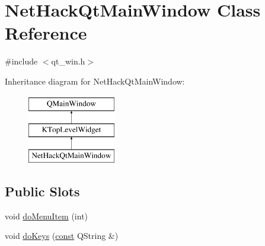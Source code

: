 \hypertarget{classNetHackQtMainWindow}{\section{Net\+Hack\+Qt\+Main\+Window Class Reference}
\label{classNetHackQtMainWindow}
}


{\ttfamily \#include $<$qt\+\_\+win.\+h$>$}

Inheritance diagram for Net\+Hack\+Qt\+Main\+Window\+:\begin{figure}[H]
\begin{center}
\leavevmode
\includegraphics[height=3.000000cm]{classNetHackQtMainWindow}
\end{center}
\end{figure}
\subsection*{Public Slots}
\begin{DoxyCompactItemize}
\item 
void \hyperlink{classNetHackQtMainWindow_aa10811365a44aee15b88af785833c11e}{do\+Menu\+Item} (int)
\item 
void \hyperlink{classNetHackQtMainWindow_ab4c2010307bd8c8a9b3fa7b69d1d7cc6}{do\+Keys} (\hyperlink{tradstdc_8h_a2c212835823e3c54a8ab6d95c652660e}{const} Q\+String \&)
\end{DoxyCompactItemize}
